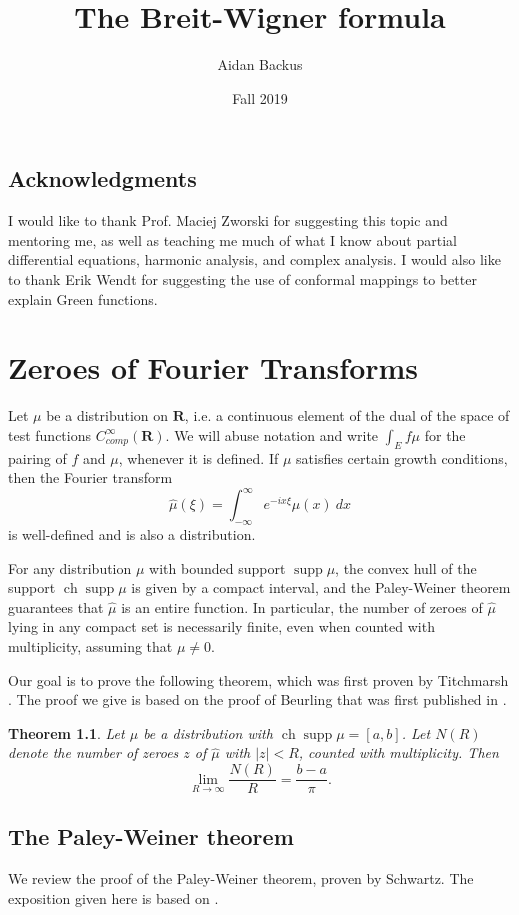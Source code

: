 \documentclass[12pt]{report}
\title{The Breit-Wigner formula}
\author{Aidan Backus}
\date{Fall 2019}
\newcommand{\RR}{\mathbf{R}}
\DeclareMathOperator{\ch}{ch}
\DeclareMathOperator{\supp}{supp}
\newtheorem{theorem}{Theorem}[chapter]
\theoremstyle{definition}
\theoremstyle{remark}
\begin{document}
\maketitle

\tableofcontents


\section*{Acknowledgments}
I would like to thank Prof. Maciej Zworski for suggesting this topic and mentoring me, as well as teaching me much of what I know about partial differential equations, harmonic analysis, and complex analysis. I would also like to thank Erik Wendt for suggesting the use of conformal mappings to better explain Green functions.



\chapter{Zeroes of Fourier Transforms}
Let $\mu$ be a distribution on $\RR$, i.e. a continuous element of the dual of the space of test functions $C^\infty_{comp}(\RR)$. We will abuse notation and write $\int_E f\mu$ for the pairing of $f$ and $\mu$, whenever it is defined. If $\mu$ satisfies certain growth conditions, then the Fourier transform
$$\hat \mu(\xi) = \int_{-\infty}^\infty e^{-ix\xi} \mu(x) ~dx$$
is well-defined and is also a distribution.

For any distribution $\mu$ with bounded support $\supp \mu$, the convex hull of the support $\ch \supp \mu$ is given by a compact interval, and the Paley-Weiner theorem guarantees that $\hat \mu$ is an entire function. In particular, the number of zeroes of $\hat \mu$ lying in any compact set is necessarily finite, even when counted with multiplicity, assuming that $\mu \neq 0$.

Our goal is to prove the following theorem, which was first proven by Titchmarsh \cite{titchmarsh1926zeros}. The proof we give is based on the proof of Beurling that was first published in \cite[Chapter XVI]{hormander2004analysis}.
\begin{theorem}
    Let $\mu$ be a distribution with $\ch \supp \mu = [a, b]$. Let $N(R)$ denote the number of zeroes $z$ of $\hat \mu$ with $|z| < R$, counted with multiplicity. Then
    $$\lim_{R \to \infty} \frac{N(R)}{R} = \frac{b-a}{\pi}.$$
\end{theorem}

\section{The Paley-Weiner theorem}
We review the proof of the Paley-Weiner theorem, proven by Schwartz. The exposition given here is based on \cite[Chapter VII]{hormander2015analysis}.
\end{document}
